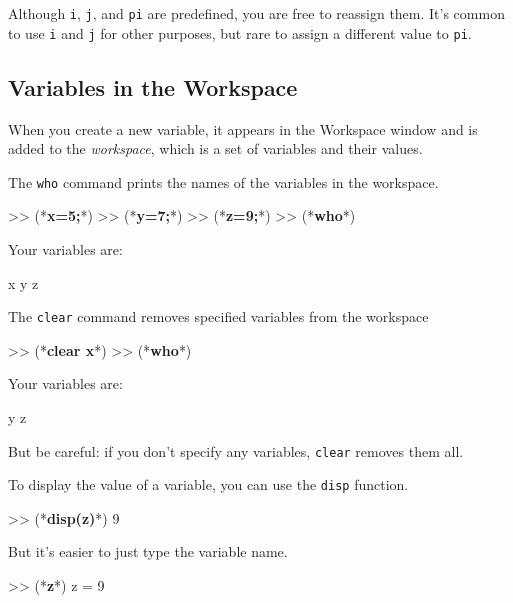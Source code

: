 
Although \lstinline{i}, \lstinline{j}, and \lstinline{pi} are predefined, you are free
to reassign them.  It's common to use \lstinline{i} and \lstinline{j} for other
purposes, but rare to assign a different value to
\lstinline{pi}.



\subsection{Variables in the Workspace}

When you create a new variable, it appears in the Workspace window and is added to the \emph{workspace}, which is a
set of variables and their values.


The \lstinline{who} command prints the
names of the variables in the workspace.


\begin{code}
>> (*\textbf{x=5;}*)
>> (*\textbf{y=7;}*)
>> (*\textbf{z=9;}*)
>> (*\textbf{who}*)

Your variables are:

x  y  z
\end{code}

The \lstinline{clear} command removes specified variables from the workspace

\begin{code}
>> (*\textbf{clear x}*)
>> (*\textbf{who}*)

Your variables are:

y z
\end{code}

But be careful: if you don't specify any variables, \lstinline{clear} removes them all.


To display the value of a variable, you can use the \lstinline{disp} function.

\begin{code}
>> (*\textbf{disp(z)}*)
     9
\end{code}

But it's easier to just type the variable name.

\begin{code}
>> (*\textbf{z}*)
z = 9
\end{code}

